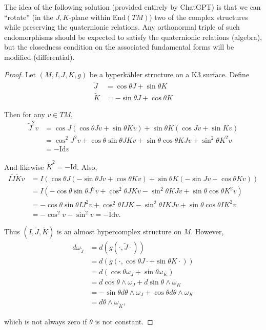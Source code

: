 \noindent
The idea of the following solution
(provided entirely by ChatGPT)
is that we can ``rotate''
(in the $J,K$-plane within $\text{End}(TM)$)
two of the complex structures while preserving the
quaternionic relations.
Any orthonormal triple of such endomorphisms
should be expected to satisfy the quaternionic relations (algebra),
but the closedness condition on the associated fundamental
forms will be modified (differential).

\begin{proof}
Let $(M,I,J,K,g)$ be a hyperkähler structure on a K3 surface.
Define
\begin{align*}
\tilde{J}&=\cos \theta J+ \sin \theta K\\
\tilde{K}&=-\sin \theta J + \cos \theta K
\end{align*}

\noindent
Then for any $v \in TM$,
\begin{align*}
\tilde{J}^2v&=\cos J(\cos \theta Jv+ \sin \theta Kv)
+\sin \theta K (\cos J v + \sin Kv)\\
&=\cos^2J^2v+\cos \theta \sin \theta J K v
+ \sin \theta \cos \theta K J v + \sin^2 \theta K^2 v\\
&=-\text{Id} v
\end{align*}

\noindent
And likewise $\tilde{K}^2=-\text{Id}$.
Also,
\begin{align*}
I \tilde{J} \tilde{K}v&=
I(\cos\theta J(-\sin \theta Jv+\cos \theta Kv)
+\sin \theta K (- \sin Jv+ \cos \theta Kv))\\
&=I (-\cos \theta \sin \theta J^2 v
+ \cos^2 \theta J K v
- \sin^2 \theta K J v
+\sin \theta \cos \theta K^2 v)\\
&=-\cos \theta \sin \theta I J^2 v
+ \cos^2 \theta I J K
- \sin^2 \theta I K J v
+ \sin \theta \cos \theta I K^2 v\\
&=-\cos^2v- \sin^2v=-\text{Id}v.
\end{align*}

\noindent
Thus $(I,\tilde{J},\tilde{K})$ is an almost hypercomplex
structure on $M$.
However,
\begin{align*}
d \omega_{\tilde{J}}&=d(g(\cdot,\tilde{J}\cdot))\\
&=d(g(\cdot,\cos \theta J\cdot + \sin \theta K\cdot))\\
&=d(\cos \theta \omega_J + \sin \theta \omega_K)\\
&=d \cos \theta \wedge \omega_J + d \sin \theta \wedge \omega_K\\
&=-\sin \theta d\theta\wedge\omega_J+\cos\theta d\theta\wedge\omega_K\\
&=d \theta \wedge \omega_{\tilde{K}},
\end{align*}

\noindent
which is not always zero if $\theta$ is not constant.
\end{proof}

